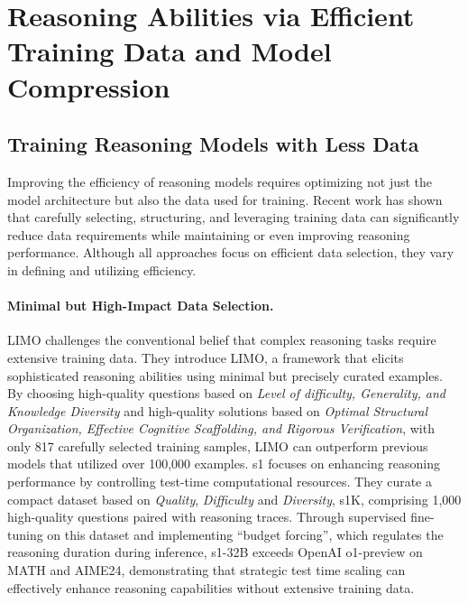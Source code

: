 \section{Reasoning Abilities via Efficient Training Data and Model Compression}

\subsection{Training Reasoning Models with Less Data}
\label{sec:lessdata}

Improving the efficiency of reasoning models requires optimizing not just the model architecture but also the data used for training. Recent work has shown that carefully selecting, structuring, and leveraging training data can significantly reduce data requirements while maintaining or even improving reasoning performance. Although all approaches focus on efficient data selection, they vary in defining and utilizing efficiency.


\paragraph{\textbf{Minimal but High-Impact Data Selection.}} LIMO \cite{ye2025limoreasoning} challenges the conventional belief that complex reasoning tasks require extensive training data. They introduce LIMO, a framework that elicits sophisticated reasoning abilities using minimal but precisely curated examples. By choosing high-quality questions based on \textit{Level of difficulty, Generality, and Knowledge Diversity} and high-quality solutions based on \textit{Optimal Structural Organization, Effective Cognitive Scaffolding, and Rigorous Verification}, with only 817 carefully selected training samples, LIMO can outperform previous models that utilized over 100,000 examples. 
%
s1 \cite{muennighoff2025s1simpletesttimescaling} focuses on enhancing reasoning performance by controlling test-time computational resources. They curate a compact dataset based on \textit{Quality}, \textit{Difficulty} and \textit{Diversity}, s1K, comprising 1,000 high-quality questions paired with reasoning traces. Through supervised fine-tuning on this dataset and implementing ``budget forcing'', which regulates the reasoning duration during inference, s1-32B exceeds OpenAI o1-preview on MATH and AIME24, demonstrating that strategic test time scaling can effectively enhance reasoning capabilities without extensive training data.

